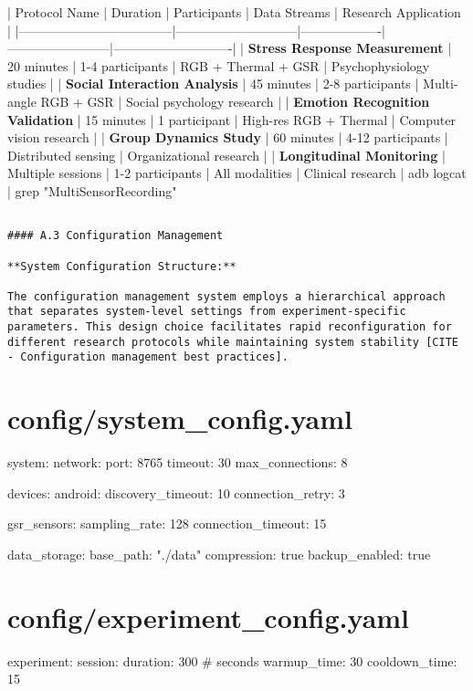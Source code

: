 \documentclass[12pt,a4paper]{report}
\begin{document}
| Protocol Name                      | Duration                    | Participants      | Data Streams           | Research Application       |
|------------------------------------|-----------------------------|-------------------|------------------------|----------------------------|
| \textbf{Stress Response Measurement}    | 20 minutes                  | 1-4 participants  | RGB + Thermal + GSR    | Psychophysiology studies   |
| \textbf{Social Interaction Analysis}    | 45 minutes                  | 2-8 participants  | Multi-angle RGB + GSR  | Social psychology research |
| \textbf{Emotion Recognition Validation} | 15 minutes                  | 1 participant     | High-res RGB + Thermal | Computer vision research   |
| \textbf{Group Dynamics Study}           | 60 minutes                  | 4-12 participants | Distributed sensing    | Organizational research    |
| \textbf{Longitudinal Monitoring}        | Multiple sessions           | 1-2 participants  | All modalities         | Clinical research          |
 adb logcat                         | grep "MultiSensorRecording" 

\begin{verbatim}

#### A.3 Configuration Management

**System Configuration Structure:**

The configuration management system employs a hierarchical approach that separates system-level settings from experiment-specific parameters. This design choice facilitates rapid reconfiguration for different research protocols while maintaining system stability [CITE - Configuration management best practices].

\end{verbatim}
\section{config/system_config.yaml}
system:
  network:
    port: 8765
    timeout: 30
    max\_connections: 8
  
  devices:
    android:
      discovery\_timeout: 10
      connection\_retry: 3
    
    gsr\_sensors:
      sampling\_rate: 128
      connection\_timeout: 15
  
  data\_storage:
    base\_path: "./data"
    compression: true
    backup\_enabled: true

\section{config/experiment_config.yaml}
experiment:
  session:
    duration: 300  \# seconds
    warmup\_time: 30
    cooldown\_time: 15
  
\end{document}
